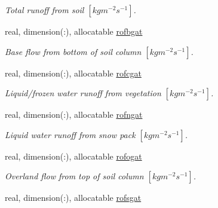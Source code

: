 \begin{DoxyCompactItemize}
\begin{DoxyCompactList}\small\item\em Total runoff from soil $[kg m^{-2} s^{-1} ]$. \end{DoxyCompactList}\item 
\hypertarget{structclass__statevars_1_1class__gather_a29acc55921867576dc83814fabc64d97}{}real, dimension(\+:), allocatable \hyperlink{structclass__statevars_1_1class__gather_a29acc55921867576dc83814fabc64d97}{rofbgat}\label{structclass__statevars_1_1class__gather_a29acc55921867576dc83814fabc64d97}

\begin{DoxyCompactList}\small\item\em Base flow from bottom of soil column $[kg m^{-2} s^{-1} ]$. \end{DoxyCompactList}\item 
\hypertarget{structclass__statevars_1_1class__gather_a6db53cba61e7def7ec03adc8659248f5}{}real, dimension(\+:), allocatable \hyperlink{structclass__statevars_1_1class__gather_a6db53cba61e7def7ec03adc8659248f5}{rofcgat}\label{structclass__statevars_1_1class__gather_a6db53cba61e7def7ec03adc8659248f5}

\begin{DoxyCompactList}\small\item\em Liquid/frozen water runoff from vegetation $[kg m^{-2} s^{-1} ]$. \end{DoxyCompactList}\item 
\hypertarget{structclass__statevars_1_1class__gather_ab2aa315e53c360add0dd658e42734663}{}real, dimension(\+:), allocatable \hyperlink{structclass__statevars_1_1class__gather_ab2aa315e53c360add0dd658e42734663}{rofngat}\label{structclass__statevars_1_1class__gather_ab2aa315e53c360add0dd658e42734663}

\begin{DoxyCompactList}\small\item\em Liquid water runoff from snow pack $[kg m^{-2} s^{-1} ]$. \end{DoxyCompactList}\item 
\hypertarget{structclass__statevars_1_1class__gather_a6c079ed89ab4b053ede3c929fc2b41ca}{}real, dimension(\+:), allocatable \hyperlink{structclass__statevars_1_1class__gather_a6c079ed89ab4b053ede3c929fc2b41ca}{rofogat}\label{structclass__statevars_1_1class__gather_a6c079ed89ab4b053ede3c929fc2b41ca}

\begin{DoxyCompactList}\small\item\em Overland flow from top of soil column $[kg m^{-2} s^{-1} ]$. \end{DoxyCompactList}\item 
\hypertarget{structclass__statevars_1_1class__gather_a3ea5b0f9ac2ae5e2f098b551bdc2438f}{}real, dimension(\+:), allocatable \hyperlink{structclass__statevars_1_1class__gather_a3ea5b0f9ac2ae5e2f098b551bdc2438f}{rofsgat}\label{structclass__statevars_1_1class__gather_a3ea5b0f9ac2ae5e2f098b551bdc2438f}


\end{DoxyCompactItemize}
